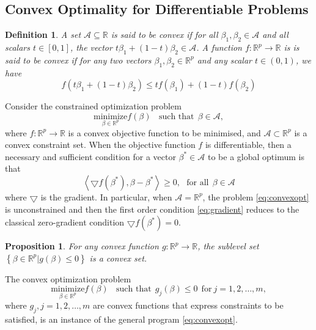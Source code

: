 \documentclass[a4paper,12pt,openany]{report}
\theoremstyle{plain}
\theoremstyle{plain}
\newtheorem{proposition}{\textbf{Proposition}}[section]
\theoremstyle{plain}
\theoremstyle{plain}
\theoremstyle{plain}
\theoremstyle{plain}
\theoremstyle{plain}
\newtheorem{definition}{\textbf{Definition}}[section]
\theoremstyle{plain}
\theoremstyle{plain}
\theoremstyle{plain}
\theoremstyle{plain}
\theoremstyle{plain}
\begin{document}
\subsection{Convex Optimality for Differentiable Problems}
\begin{definition}
	A set $\mathcal{A}\subseteq\mathbb{R}$ is said to be convex if for all $\beta_1, \beta_2\in\mathcal{A}$ and all scalars $t\in\left[0,1\right]$, the vector $t\beta_1+(1-t)\beta_2\in\mathcal{A}$. A function $f : \mathbb{R}^p\to\mathbb{R}$ is is said to be convex if for any two vectors $\beta_1, \beta_2\in\mathbb{R}^p$ and any scalar $t\in(0,1)$, we have
	\begin{equation}
	f(t\beta_1+(1-t)\beta_2) \leq tf(\beta_1) + (1-t)f(\beta_2)
	\end{equation}
\end{definition}
Consider the constrained optimization problem
\begin{equation}\label{eq:convexopt}
\underset{\beta\in\mathbb{R}^p}{\text{minimize}}f(\beta)\ \ \ \ \text{such that}\ \ \beta\in\mathcal{A},
\end{equation}
where $f : \mathbb{R}^p\to\mathbb{R}$ is a convex objective function to be minimised, and $\mathcal{A}\subset\mathbb{R}^p$ is a convex constraint set. When the objective function $f$ is differentiable, then a necessary and sufficient condition for a vector $\beta^*\in\mathcal{A}$ to be a global optimum is that
\begin{equation}\label{eq:gradient}
\left\langle\bigtriangledown f(\beta^*), \beta-\beta^*\right\rangle\geq 0, \ \ \ \text{for all}\ \ \beta\in\mathcal{A}
\end{equation}
where $\bigtriangledown$ is the gradient. In particular, when $\mathcal{A}=\mathbb{R}^p$, the problem \eqref{eq:convexopt} is unconstrained and then the first order condition \eqref{eq:gradient} reduces to the classical zero-gradient condition $\bigtriangledown f(\beta^*) = 0$.
\begin{proposition}
	For any convex function $g : \mathbb{R}^p\to\mathbb{R}$, the sublevel set $\left\lbrace\beta\in\mathbb{R}^p| g(\beta)\leq 0\right\rbrace$ is a convex set.
\end{proposition}
The convex optimization problem
\begin{equation}\label{eq:convexopt2}
\underset{\beta\in\mathbb{R}^p}{\text{minimize}}f(\beta)\ \ \ \ \text{such that}\ \ g_j(\beta)\leq 0\ \ \text{for} \ j=1,2,\ldots,m,
\end{equation}
where $g_j,j=1,2,\ldots,m$ are convex functions that express constraints to be satisfied, is an instance of the general program \eqref{eq:convexopt}.
\end{document}
